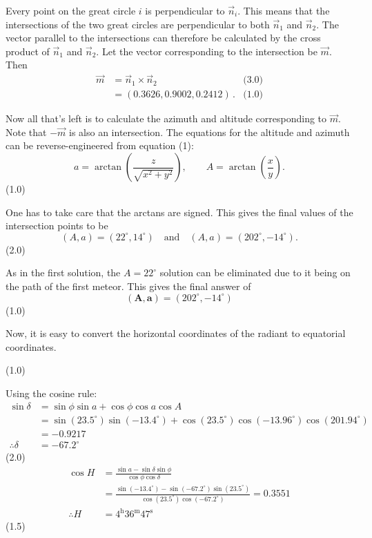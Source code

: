 \begin{description}
  Every point on the great circle $i$ is perpendicular to $\vec{n}_i$. This
  means that the intersections of the two great circles are perpendicular to
  both $\vec{n}_1$ and $\vec{n}_2$. The vector parallel to the intersections
  can therefore be calculated by the cross product of $\vec{n}_1$ and
  $\vec{n}_2$. Let the vector corresponding to the intersection be $\vec{m}$.
  Then
  \begin{align*}
    \vec{m} &= \vec{n}_1 \times \vec{n}_2 & \text{(3.0)}\\
            &= (0.3626, 0.9002, 0.2412)\,. & \text{(1.0)}
  \end{align*}

  Now all that's left is to calculate the azimuth and altitude corresponding
  to $\vec{m}$. Note that $-\vec{m}$ is also an intersection. The equations
  for the altitude and azimuth can be reverse-engineered from equation (1):
  \[
    a = \arctan\left(\frac{z}{\sqrt{x^2 + y^2}}\right), \qquad
    A = \arctan\left(\frac{x}{y}\right).
  \]
  \hfill(1.0)

  One has to take care that the arctans are signed. This gives the final
  values of the intersection points to be
  \[
    (A, a) = (22^\circ, 14^\circ)
    \quad\text{and}\quad
    (A, a) = (202^\circ, -14^\circ).
  \]
  \hfill(2.0)

  As in the first solution, the $A = 22^\circ$ solution can be eliminated due
  to it being on the path of the first meteor. This gives the final answer of
  \[
    (\mathbf{A}, \mathbf{a}) = (202^\circ, -14^\circ)
  \]
  \hfill(1.0)

\item[(c)] Now, it is easy to convert the horizontal coordinates of the
  radiant to equatorial coordinates.

  \hfill(1.0)

  Using the cosine rule:
  \begin{align*}
    \sin\delta &= \sin\phi \sin a + \cos\phi \cos a \cos A\\
      &= \sin(23.5^\circ)\sin(-13.4^\circ)
         + \cos(23.5^\circ)\cos(-13.96^\circ)\cos(201.94^\circ)\\
      &= -0.9217\\
    \therefore \delta &= -67.2^\circ
  \end{align*}
  \hfill(2.0)
  \begin{align*}
    \cos H &= \frac{\sin a - \sin\delta \sin\phi}{\cos\phi \cos\delta}\\
      &= \frac{\sin(-13.4^\circ) - \sin(-67.2^\circ)\sin(23.5^\circ)}
              {\cos(23.5^\circ)\cos(-67.2^\circ)} = 0.3551\\
    \therefore H &= 4^{\mathrm{h}}36^{\mathrm{m}}47^{\mathrm{s}}
  \end{align*}
  \hfill(1.5)


\end{description}
